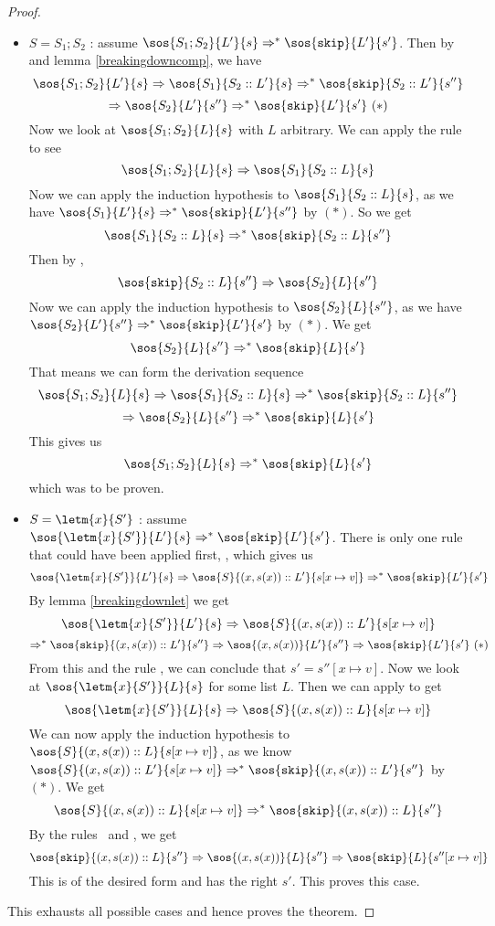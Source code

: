 \begin{proof}
\begin{itemize}[noitemsep]
    \item $S = S_1; S_2$ : assume $\sos{ S_1;S_2}{L'}{ s} \Rightarrow ^{*} \sos{\texttt{skip}}{L'}{s'}$. Then by \compsos and lemma \ref{breakingdowncomp}, we have 
    $$\sos{S_1;S_2}{L'}{s} \Rightarrow \sos{S_1}{S_2::L'}{s} \Rightarrow ^{*} \sos{\texttt{skip}}{S_2::L'}{s''}$$ $$\Rightarrow \sos{S_2}{L'}{s''} \Rightarrow ^{*} \sos{\texttt{skip}}{L'}{s'} ~( * )$$
    Now we look at $\sos{S_1;S_2}{L}{s}$ with $L$ arbitrary. We can apply the rule \compsos to see $$\sos{S_1;S_2}{L}{s} \Rightarrow \sos{S_1}{S_2::L}{s}$$ Now we can apply the induction hypothesis to $\sos{S_1}{S_2::L}{s}$, as we have $\sos{S_1}{L'}{s} \Rightarrow ^{*} \sos{\texttt{skip}}{L'}{s''}$ by $( * )$. So we get 
    $$\sos{S_1}{S_2::L}{s} \Rightarrow ^{*} \sos{\texttt{skip}}{S_2::L}{s''}$$
    Then by \loadsos, 
    $$\sos{\texttt{skip}}{S_2::L}{s''} \Rightarrow \sos{S_2}{L}{s''}$$
    Now we can apply the induction hypothesis to $\sos{S_2}{L}{s''}$, as we have $\sos{S_2}{L'}{s''} \Rightarrow ^{*} \sos{\texttt{skip}}{L'}{s'}$ by $( * )$. We get 
    $$\sos{S_2}{L}{s''} \Rightarrow ^{*} \sos{\texttt{skip}}{L}{s'}$$
    That means we can form the derivation sequence $$\sos{S_1;S_2}{L}{s} \Rightarrow \sos{S_1}{S_2::L}{s} \Rightarrow ^{*} \sos{\texttt{skip}}{S_2::L}{s''} $$ $$ \Rightarrow \sos{S_2}{L}{s''} \Rightarrow ^{*} \sos{\texttt{skip}}{L}{s'}$$
    This gives us 
    $$\sos{S_1;S_2}{L}{s} \Rightarrow ^{*} \sos{\texttt{skip}}{L}{s'}$$
    which was to be proven. 
        
    \item $S = \letm{x}{S'}$ : assume $\sos{\letm{x}{S'}}{L'}{s} \Rightarrow ^{*} \sos{\texttt{skip}}{L'}{s'}$. There is only one rule that could have been applied first, , which gives us 
    $$\sos{\letm{x}{S'}}{L'}{s} \Rightarrow \sos{S}{(x,s(x))::L'}{s[x\mapsto v]} \Rightarrow ^{*} \sos{\texttt{skip}}{L'}{s'}$$
    By lemma \ref{breakingdownlet} we get 
    $$\sos{\letm{x}{S'}}{L'}{s} \Rightarrow \sos{S}{(x,s(x))::L'}{s[x\mapsto v]}$$ $$\Rightarrow ^{*} \sos{\texttt{skip}}{(x,s(x))::L'}{s''} \Rightarrow \sos{(x,s(x))}{L'}{s''} \Rightarrow \sos{\texttt{skip}}{L'}{s'} ~ ( * )$$
    From this and the rule \setsos, we can conclude that $s' = s''[x\mapsto v]$.
    Now we look at $\sos{\letm{x}{S'}}{L}{s}$ for some list $L$. Then we can apply  to get 
    $$\sos{\letm{x}{S'}}{L}{s} \Rightarrow \sos{S}{(x,s(x))::L}{s[x\mapsto v]}$$
    We can now apply the induction hypothesis to $\sos{S}{(x,s(x))::L}{s[x\mapsto v]}$, as we know $\sos{S}{(x,s(x))::L'}{s[x\mapsto v]} \Rightarrow ^{*} \sos{\texttt{skip}}{(x,s(x))::L'}{s''}$ by $( * )$. We get
    $$\sos{S}{(x,s(x))::L}{s[x\mapsto v]} \Rightarrow ^{*} \sos{\texttt{skip}}{(x,s(x))::L}{s''}$$
    By the rules \loadsos ~and \setsos, we get 
    $$\sos{\texttt{skip}}{(x,s(x))::L}{s''} \Rightarrow \sos{(x,s(x))}{L}{s''} \Rightarrow \sos{\texttt{skip}}{L}{s''[x \mapsto v]}$$
    This is of the desired form and has the right $s'$. This proves this case.
\end{itemize}
This exhausts all possible cases and hence proves the theorem.
\end{proof}

